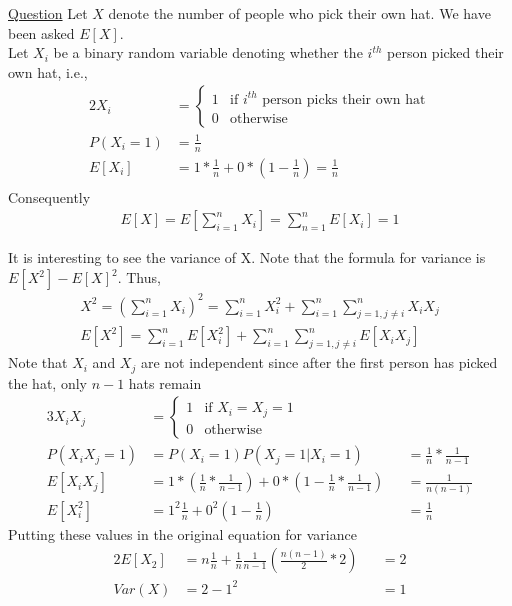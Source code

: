 \documentclass[../probability-notes.tex]{subfiles}
\begin{document}
\begin{enumerate}
        \hypertarget{a_hatproblem}{\item} \hyperlink{q_hatproblem}{Question}\newline
        Let $X$ denote the number of people who pick their own hat. We have been asked $E[X]$.\\
        Let $X_{i}$ be a binary random variable denoting whether the $i^{th}$ person picked their own hat, i.e.,
        \begin{alignat*}{2}
            X_{i} &= \begin{cases} 1 &\mbox{if $i^{th}$ person picks their own hat}\\ 
                                    0 &\mbox{otherwise} \end{cases} \\
            P(X_{i} = 1) &= \frac{1}{n} \\
            E[X_{i}] &= 1 * \frac{1}{n} + 0 * (1 - \frac{1}{n}) = \frac{1}{n}\\
        \end{alignat*}
        Consequently
        \begin{align*}
            E[X] = E[\sum_{i=1}^{n} X_{i}] = \sum_{n=1}^{n}E[X_{i}] = 1
        \end{align*}

        It is interesting to see the variance of X. Note that the formula for variance is $E[X^{2}] - E[X]^{2}$. Thus,
        \begin{align*}
            X^{2} = (\sum_{i=1}^{n} X_{i})^{2} = \sum_{i=1}^{n} X_{i}^{2} + \sum_{i=1}^{n} \sum_{j=1, j\neq i}^{n} X_{i}X{_j} \\
            E[X^{2}] = \sum_{i=1}^{n}E[X_{i}^{2}] + \sum_{i=1}^{n} \sum_{j=1, j\neq i}^{n} E[X_{i}X{_j}] 
        \end{align*}
        Note that $X_{i}$ and $X_{j}$ are not independent since after the first person has picked the hat, only $n-1$ hats remain
        \begin{alignat*}{3}
            X_{i}X_{j} &= \begin{cases} 1 &\mbox{if $X_{i} = X_{j} = 1$}\\
                                       0 &\mbox{otherwise} \end{cases} \\
            P(X_{i}X_{j} = 1) &= P(X_{i} = 1) P(X_{j} = 1|X_{i} = 1) &&= \frac{1}{n} * \frac{1}{n-1}\\
            E[X_{i}X_{j}] &= 1 * (\frac{1}{n} * \frac{1}{n-1}) + 0 * (1 - \frac{1}{n} * \frac{1}{n-1}) &&= \frac{1}{n(n-1)}\\
            E[X_{i}^2] &= 1^{2} \frac{1}{n} + 0^{2} (1-\frac{1}{n}) &&= \frac{1}{n}
        \end{alignat*}
        Putting these values in the original equation for variance
        \begin{alignat*}{2}
            E[X_{2}] &= n \frac{1}{n} + \frac{1}{n} \frac{1}{n-1} (\frac{n(n-1)}{2} * 2) &&= 2\\
            Var(X) &= 2 - 1^{2} &&= 1
        \end{alignat*}
        


\end{enumerate}
\end{document}
